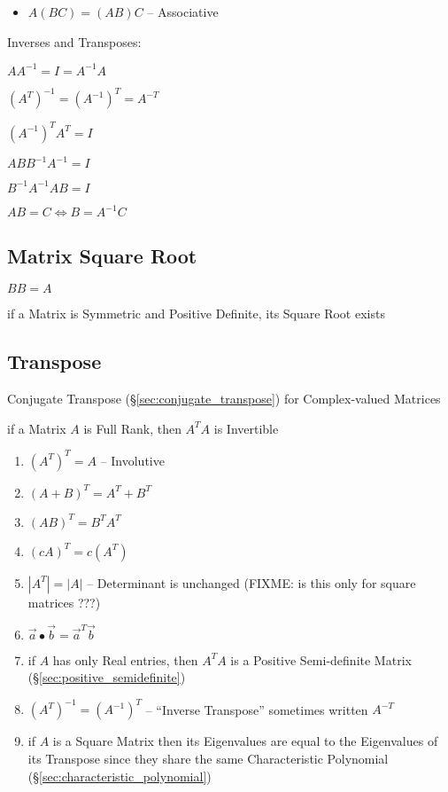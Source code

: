 \begin{itemize}
  \item $A(BC) = (AB)C$ -- Associative
\end{itemize}

Inverses and Transposes:

$AA^{-1} = I = A^{-1}A$

$(A^T)^{-1} = (A^{-1})^T = A^{-T}$

$(A^{-1})^T A^T = I$

$ABB^{-1}A^{-1} = I$

$B^{-1}A^{-1}AB = I$

$AB = C \Leftrightarrow B = A^{-1}C$



\subsection{Matrix Square Root}\label{sec:matrix_square_root}

$BB = A$

if a Matrix is Symmetric and Positive Definite, its Square Root exists



\subsection{Transpose}\label{sec:transpose}

Conjugate Transpose (\S\ref{sec:conjugate_transpose}) for Complex-valued
Matrices

if a Matrix $A$ is Full Rank, then $A^TA$ is Invertible

\begin{enumerate}
  \item $(A^T)^T = A$ -- Involutive
  \item $(A+B)^T = A^T + B^T$
  \item $(AB)^T = B^T A^T$
  \item $(cA)^T = c(A^T)$
  \item $|A^T| = |A|$ -- Determinant is unchanged (FIXME: is this only for
    square matrices ???)
  \item $\vec{a} \bullet \vec{b} = \vec{a}^T\vec{b}$
  \item if $A$ has only Real entries, then $A^T A$ is a Positive Semi-definite
    Matrix (\S\ref{sec:positive_semidefinite})
  \item $(A^T)^{-1} = (A^{-1})^T$ -- ``Inverse Transpose'' sometimes written
    $A^{-T}$
  \item if $A$ is a Square Matrix then its Eigenvalues are equal to the
    Eigenvalues of its Transpose since they share the same Characteristic
    Polynomial (\S\ref{sec:characteristic_polynomial})
\end{enumerate}




